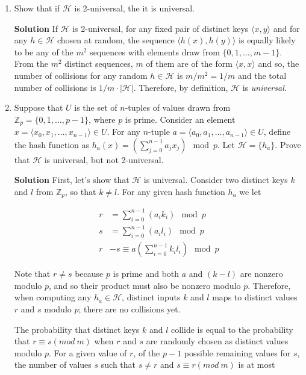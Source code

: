 \documentclass[12pt, a4paper]{article} %
\begin{document}
\begin{enumerate}[label=(\alph*)]
  \item Show that if $\mathcal{H}$ is 2-universal, the it is universal.

  \textbf{Solution} If $\mathcal{H}$ is 2-universal, for any fixed pair of distinct keys $\langle x, y\rangle$ and for any $h \in \mathcal{H}$ chosen at random, the sequence $\langle h(x), h(y) \rangle$ is equally likely to be any of the $m^{2}$ sequences with elements draw from $\{0,1, \ldots , m - 1\}$. From the $m^{2}$ distinct sequences, $m$ of them are of the form $\langle x, x \rangle$ and so, the number of collisions for any random $h \in \mathcal{H}$ is $m/m^{2} = 1/m$ and the total number of collisions is $1/m \cdot |\mathcal{H}|$. Therefore, by definition, $\mathcal{H}$ is \textit{universal}.

  \item Suppose that $U$ is the set of $n$-tuples of values drawn from $ \mathbb{Z}_{p} = \{0,1,\ldots, p - 1\}$, where $p$ is prime. Consider an element $x = \langle x_{0}, x_{1}, \ldots, x_{n-1}\rangle \in U$. For any $n$-tuple $a = \langle a_{0}, a_{1}, \ldots, a_{n-1}\rangle \in U$, define the hash function as $h_{a}(x) = (\sum_{j=0}^{n-1}a_{j}x_{j}) \mod p$. Let $\mathcal{H} = \{h_{a}\}$. Prove that $\mathcal{H}$ is universal, but not 2-universal.

    \textbf{Solution} First, let's show that $\mathcal{H}$ is universal. Consider two distinct keys $k$ and $l$ from $\mathbb{Z}_{p}$, so that $k \neq l$. For any given hash function $h_{a}$ we let

    \begin{align*}
      r &= \sum_{i = 0}^{n-1}(a_{i}k_{i}) \mod p \\
      s &= \sum_{i = 0}^{n-1}(a_{i}l_{i}) \mod p \\
      r &- s \equiv a(\sum_{i = 0}^{n-1} k_{i} l_{i}) \mod p
    \end{align*}

    Note that $r \neq s$ because $p$ is prime and both $a$ and $(k - l)$ are nonzero modulo $p$, and so their product must also be nonzero modulo $p$. Therefore, when computing any $h_{a} \in \mathcal{H}$, distinct inputs $k$ and $l$ maps to distinct values $r$ and $s$ modulo $p$; there are no collisions yet.

    The probability that distinct keys $k$ and $l$ collide is equal to the probability that $r \equiv s (mod \ m)$ when $r$ and $s$ are randomly chosen as distinct values modulo $p$. For a given value of $r$, of the $p - 1$ possible remaining values for $s$, the number of values $s$ such that $s \neq r$ and $s \equiv r (mod \ m)$ is at most


\end{enumerate}
\end{document}
